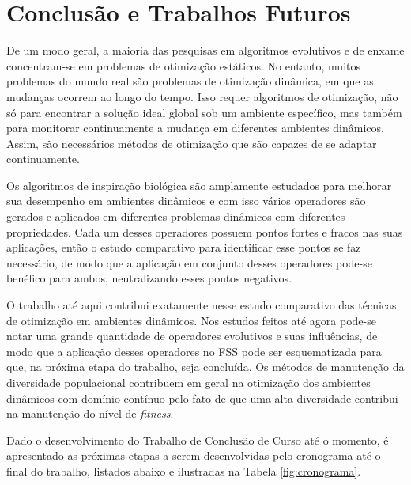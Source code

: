 \chapter{Conclusão e Trabalhos Futuros}
\label{ch:consideracoes}

De um modo geral, a maioria das pesquisas em algoritmos evolutivos e de enxame concentram-se em problemas de otimização estáticos. No entanto, muitos problemas do mundo real são problemas de otimização dinâmica, em que as mudanças ocorrem ao longo do tempo. Isso requer algoritmos de otimização, não só para encontrar a solução ideal global sob um ambiente específico, mas também para monitorar continuamente a mudança em diferentes ambientes dinâmicos. Assim, são necessários métodos de otimização que são capazes de se adaptar continuamente.

Os algoritmos de inspiração biológica são amplamente estudados para melhorar sua desempenho em ambientes dinâmicos e com isso vários operadores são gerados e aplicados em diferentes problemas dinâmicos com diferentes propriedades. Cada um desses operadores possuem pontos fortes e fracos nas suas aplicações, então o estudo comparativo para identificar esse pontos se faz necessário, de modo que a aplicação em conjunto desses operadores pode-se benéfico para ambos, neutralizando esses pontos negativos.

O trabalho até aqui contribui exatamente nesse estudo comparativo das técnicas de otimização em ambientes dinâmicos. Nos estudos feitos até agora pode-se notar uma grande quantidade de operadores evolutivos e suas influências, de modo que a aplicação desses operadores no FSS pode ser esquematizada para que, na próxima etapa do trabalho, seja concluída. Os métodos de manutenção da diversidade populacional contribuem em geral na otimização dos ambientes dinâmicos com domínio contínuo pelo fato de que uma alta diversidade contribui na manutenção do nível de \textit{fitness}.

Dado o desenvolvimento do Trabalho de Conclusão de Curso até o momento, é apresentado as próximas etapas a serem desenvolvidas pelo cronograma até o final do trabalho, listados abaixo e ilustradas na Tabela \ref{fig:cronograma}.

